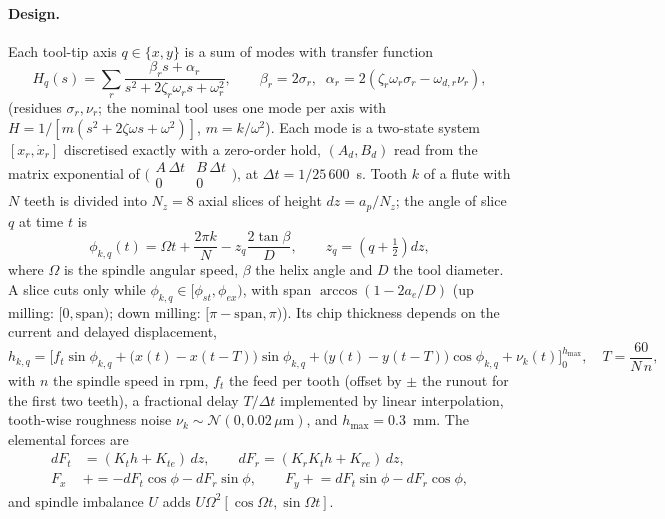\documentclass[11pt]{article}
\begin{document}
\paragraph{Design.} Each tool-tip axis $q\in\{x,y\}$ is a sum of modes with transfer function
\begin{equation}
H_q(s)=\sum_{r}\frac{\beta_r s+\alpha_r}{s^2+2\zeta_r\omega_r s+\omega_r^2},\qquad \beta_r=2\sigma_r,\;\;\alpha_r=2(\zeta_r\omega_r\sigma_r-\omega_{d,r}\nu_r),
\end{equation}
(residues $\sigma_r,\nu_r$; the nominal tool uses one mode per axis with $H=1/[m(s^2+2\zeta\omega s+\omega^2)]$, $m=k/\omega^2$). Each mode is a two-state system $[x_r,\dot x_r]$ discretised exactly with a zero-order hold, $(A_d,B_d)$ read from the matrix exponential of $\bigl(\begin{smallmatrix}A\,\Delta t & B\,\Delta t\\ 0&0\end{smallmatrix}\bigr)$, at $\Delta t=1/25\,600$~s.
Tooth $k$ of a flute with $N$ teeth is divided into $N_z{=}8$ axial slices of height $dz=a_p/N_z$; the angle of slice $q$ at time $t$ is
\begin{equation}
\phi_{k,q}(t)=\Omega t+\frac{2\pi k}{N}-z_q\frac{2\tan\beta}{D},\qquad z_q=(q+\tfrac12)dz,
\end{equation}
where $\Omega$ is the spindle angular speed, $\beta$ the helix angle and $D$ the tool diameter. A slice cuts only while $\phi_{k,q}\in[\phi_{st},\phi_{ex})$, with span $\arccos(1-2a_e/D)$ (up milling: $[0,\text{span})$; down milling: $[\pi-\text{span},\pi)$). Its chip thickness depends on the current and delayed displacement,
\begin{equation}
h_{k,q}=\Big[f_t\sin\phi_{k,q}+\big(x(t)-x(t-T)\big)\sin\phi_{k,q}+\big(y(t)-y(t-T)\big)\cos\phi_{k,q}+\nu_k(t)\Big]_{0}^{h_{\max}},\quad T=\frac{60}{N\,n},
\end{equation}
with $n$ the spindle speed in rpm, $f_t$ the feed per tooth (offset by $\pm$ the runout for the first two teeth), a fractional delay $T/\Delta t$ implemented by linear interpolation, tooth-wise roughness noise $\nu_k\sim\mathcal N(0,0.02\,\mu\text{m})$, and $h_{\max}=0.3$~mm. The elemental forces are
\begin{align}
dF_t&=(K_t h+K_{te})\,dz,\qquad dF_r=(K_rK_t h+K_{re})\,dz,\\
F_x&\mathrel{+}=-dF_t\cos\phi-dF_r\sin\phi,\qquad F_y\mathrel{+}=dF_t\sin\phi-dF_r\cos\phi,
\end{align}
and spindle imbalance $U$ adds $U\Omega^2[\cos\Omega t,\sin\Omega t]$.
\end{document}
